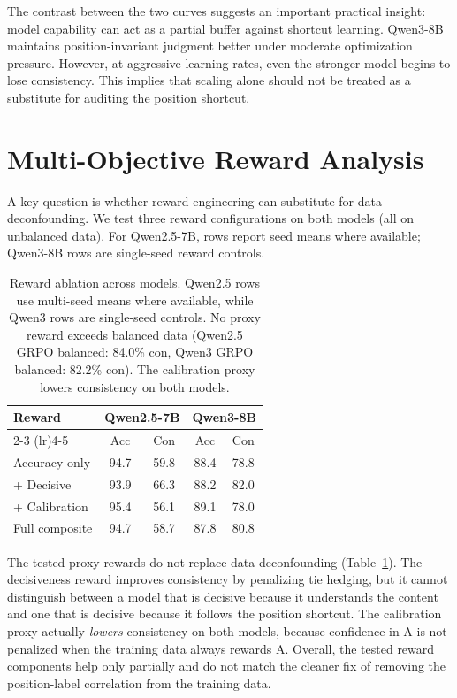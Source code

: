 \documentclass[letterpaper]{article}
\begin{document}
The contrast between the two curves suggests an important practical insight: model capability can act as a partial buffer against shortcut learning. Qwen3-8B maintains position-invariant judgment better under moderate optimization pressure. However, at aggressive learning rates, even the stronger model begins to lose consistency. This implies that scaling alone should not be treated as a substitute for auditing the position shortcut.

\section{Multi-Objective Reward Analysis}
\label{app:reward}

A key question is whether reward engineering can substitute for data deconfounding. We test three reward configurations on both models (all on unbalanced data). For Qwen2.5-7B, rows report seed means where available; Qwen3-8B rows are single-seed reward controls.

\begin{table}[htbp]
\centering
\footnotesize
\begin{tabular}{lcccc}
\toprule
\textbf{Reward} & \multicolumn{2}{c}{\textbf{Qwen2.5-7B}} & \multicolumn{2}{c}{\textbf{Qwen3-8B}} \\
\cmidrule(lr){2-3} \cmidrule(lr){4-5}
 & Acc & Con & Acc & Con \\
\midrule
Accuracy only & 94.7 & 59.8 & 88.4 & 78.8 \\
+ Decisive & 93.9 & 66.3 & 88.2 & 82.0 \\
+ Calibration & 95.4 & 56.1 & 89.1 & 78.0 \\
Full composite & 94.7 & 58.7 & 87.8 & 80.8 \\
\bottomrule
\end{tabular}
\caption{Reward ablation across models. Qwen2.5 rows use multi-seed means where available, while Qwen3 rows are single-seed controls. No proxy reward exceeds balanced data (Qwen2.5 GRPO balanced: 84.0\% con, Qwen3 GRPO balanced: 82.2\% con). The calibration proxy lowers consistency on both models.}
\label{tab:reward_ablation}
\end{table}

The tested proxy rewards do not replace data deconfounding (Table~\ref{tab:reward_ablation}). The decisiveness reward improves consistency by penalizing tie hedging, but it cannot distinguish between a model that is decisive because it understands the content and one that is decisive because it follows the position shortcut. The calibration proxy actually \emph{lowers} consistency on both models, because confidence in A is not penalized when the training data always rewards A. Overall, the tested reward components help only partially and do not match the cleaner fix of removing the position-label correlation from the training data.
\end{document}
